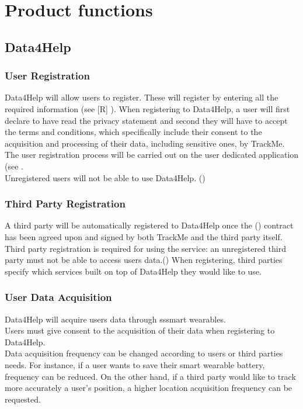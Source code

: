 \documentclass[../../rasd.tex]{subfiles}
\begin{document}
\section{Product functions}
			\subsection{Data4Help}
			
				\subsubsection{User Registration}
				Data4Help will allow users to register. These will register by entering all the required information (see [R] ). When registering to Data4Help, a user will first declare to have read the privacy statement and second they will have to accept the terms and conditions, which specifically include their consent to the acquisition and processing of their data, including sensitive ones, by TrackMe.\\
				The user registration process will be carried out on the user dedicated application (see .\\
				Unregistered users will not be able to use Data4Help. ()
			
				\subsubsection{Third Party Registration}
				A third party will be automatically registered to Data4Help once the () contract has been agreed upon and signed by both TrackMe and the third party itself.\\
				Third party registration is required for using the service: an unregistered third party must not be able to access users data.()
				When registering, third parties specify which services built on top of Data4Help they would like to use.
			
				\subsubsection{User Data Acquisition}
				Data4Help will acquire users data through sssmart wearables. \\
				Users must give consent to the acquisition of their data when registering to Data4Help.\\
				Data acquisition frequency can be changed according to users or third parties needs. For instance, if a user wants to save their smart wearable battery, frequency can be reduced. On the other hand, if a third party would like to track more accurately a user's position, a higher location acquisition frequency can be requested.	
\end{document}
